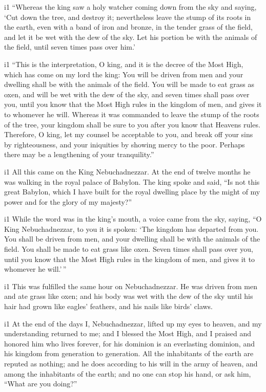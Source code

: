 i1  ``Whereas the king saw a holy watcher coming down
from the sky and saying, `Cut down the tree, and destroy it;
nevertheless leave the stump of its roots in the earth, even with a band
of iron and bronze, in the tender grass of the field, and let it be wet
with the dew of the sky. Let his portion be with the animals of the
field, until seven times pass over him.'

i1  ``This is the interpretation, O king, and it is the
decree of the Most High, which has come on my lord the king:
 You will be driven from men and your dwelling shall be
with the animals of the field. You will be made to eat grass as oxen,
and will be wet with the dew of the sky, and seven times shall pass over
you, until you know that the Most High rules in the kingdom of men, and
gives it to whomever he will.  Whereas it was commanded
to leave the stump of the roots of the tree, your kingdom shall be sure
to you after you know that Heavens rules.  Therefore, O
king, let my counsel be acceptable to you, and break off your sins by
righteousness, and your iniquities by showing mercy to the poor. Perhaps
there may be a lengthening of your tranquility.''

i1  All this came on the King Nebuchadnezzar.
 At the end of twelve months he was walking in the royal
palace of Babylon.  The king spoke and said, ``Is not
this great Babylon, which I have built for the royal dwelling place by
the might of my power and for the glory of my majesty?''

i1  While the word was in the king's mouth, a voice came
from the sky, saying, ``O King Nebuchadnezzar, to you it is spoken: `The
kingdom has departed from you.  You shall be driven from
men, and your dwelling shall be with the animals of the field. You shall
be made to eat grass like oxen. Seven times shall pass over you, until
you know that the Most High rules in the kingdom of men, and gives it to
whomever he will.'\,''

i1  This was fulfilled the same hour on Nebuchadnezzar.
He was driven from men and ate grass like oxen; and his body was wet
with the dew of the sky until his hair had grown like eagles' feathers,
and his nails like birds' claws.

i1  At the end of the days I, Nebuchadnezzar, lifted up
my eyes to heaven, and my understanding returned to me; and I blessed
the Most High, and I praised and honored him who lives forever, for his
dominion is an everlasting dominion, and his kingdom from generation to
generation.  All the inhabitants of the earth are reputed
as nothing; and he does according to his will in the army of heaven, and
among the inhabitants of the earth; and no one can stop his hand, or ask
him, ``What are you doing?''

